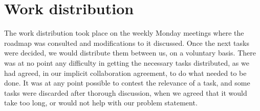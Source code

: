 \section{Work distribution}
The work distribution took place on the weekly Monday meetings where the roadmap was consulted and modifications to it discussed. Once the next tasks were decided, we would distribute them between us, on a voluntary basis. There was at no point any difficulty in getting the necessary tasks distributed, as we had agreed, in our implicit collaboration agreement, to do what needed to be done. It was at any point possible to contest the relevance of a task, and some tasks were discarded after thorough discussion, when we agreed that it would take too long, or would not help with our problem statement.